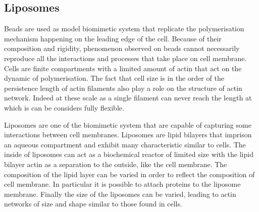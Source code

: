 \documentclass[A4paperpaper,11pt,english]{sphinxmanual}
\begin{document}
\subsection{Liposomes}
\label{parts/part1:liposomes}
Beads are used as model biomimetic system that replicate the polymerisation mechanism
happening on the leading edge of the cell. Because of their composition and
rigidity, phenomenon observed on beads cannot necessarily reproduce all the interactions and
processes that take place on cell membrane. Cells are finite compartments with a
limited amount of actin that act on the dynamic of polymerisation.  The fact
that cell size is in the order of the persistence length of actin filaments
also play a role on the structure of actin network. Indeed at these scale as a
single filament can never reach the length at which is can be considers fully
flexible.

Liposomes are one of the biomimetic system that are capable of capturing some
interactions between cell membranes. Liposomes are lipid bilayers that imprison
an aqueous compartment and exhibit many characteristic similar to cells.
The inside of liposomes can act as a biochemical reactor of limited size with
the lipid bilayer actin as a separation to the outside, like the cell
membrane. The composition of the lipid layer can be varied in order to reflect
the composition of cell membrane. In particular it is possible to attach
proteins to the liposome membrane. Finally the size of the liposomes can be
varied, leading to actin networks of size and shape similar to those found in
cells.
\end{document}
